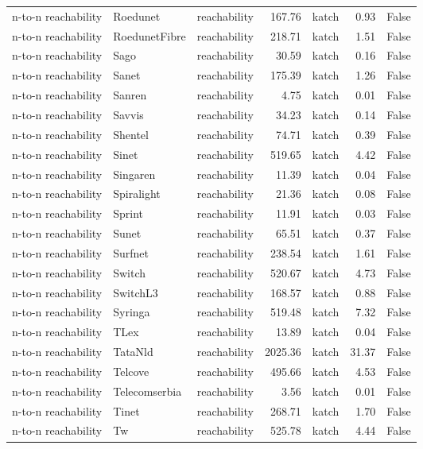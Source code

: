 \begin{tabular}{lllrlrr}
n-to-n reachability & Roedunet & reachability & 167.76 & katch & 0.93 & False \\
n-to-n reachability & RoedunetFibre & reachability & 218.71 & katch & 1.51 & False \\
n-to-n reachability & Sago & reachability & 30.59 & katch & 0.16 & False \\
n-to-n reachability & Sanet & reachability & 175.39 & katch & 1.26 & False \\
n-to-n reachability & Sanren & reachability & 4.75 & katch & 0.01 & False \\
n-to-n reachability & Savvis & reachability & 34.23 & katch & 0.14 & False \\
n-to-n reachability & Shentel & reachability & 74.71 & katch & 0.39 & False \\
n-to-n reachability & Sinet & reachability & 519.65 & katch & 4.42 & False \\
n-to-n reachability & Singaren & reachability & 11.39 & katch & 0.04 & False \\
n-to-n reachability & Spiralight & reachability & 21.36 & katch & 0.08 & False \\
n-to-n reachability & Sprint & reachability & 11.91 & katch & 0.03 & False \\
n-to-n reachability & Sunet & reachability & 65.51 & katch & 0.37 & False \\
n-to-n reachability & Surfnet & reachability & 238.54 & katch & 1.61 & False \\
n-to-n reachability & Switch & reachability & 520.67 & katch & 4.73 & False \\
n-to-n reachability & SwitchL3 & reachability & 168.57 & katch & 0.88 & False \\
n-to-n reachability & Syringa & reachability & 519.48 & katch & 7.32 & False \\
n-to-n reachability & TLex & reachability & 13.89 & katch & 0.04 & False \\
n-to-n reachability & TataNld & reachability & 2025.36 & katch & 31.37 & False \\
n-to-n reachability & Telcove & reachability & 495.66 & katch & 4.53 & False \\
n-to-n reachability & Telecomserbia & reachability & 3.56 & katch & 0.01 & False \\
n-to-n reachability & Tinet & reachability & 268.71 & katch & 1.70 & False \\
n-to-n reachability & Tw & reachability & 525.78 & katch & 4.44 & False \\

\end{tabular}
